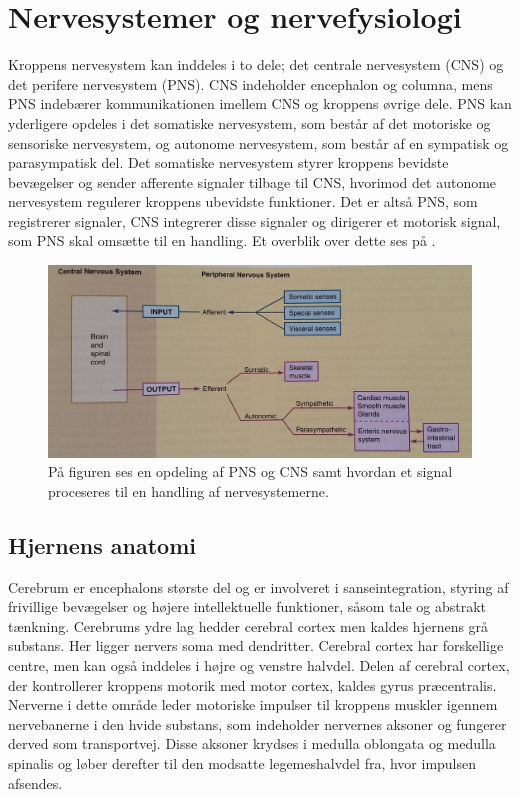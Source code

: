 \chapter{Nervesystemer og nervefysiologi}\label{AppNerve}
Kroppens nervesystem kan inddeles i to dele; det centrale nervesystem (CNS) og det perifere nervesystem (PNS). CNS indeholder encephalon og columna, mens PNS indebærer kommunikationen imellem CNS og kroppens øvrige dele. PNS kan yderligere opdeles i det somatiske nervesystem, som består af det motoriske og sensoriske nervesystem, og autonome nervesystem, som består af en sympatisk og parasympatisk del. Det somatiske nervesystem styrer kroppens bevidste bevægelser og sender afferente signaler tilbage til CNS, hvorimod det autonome nervesystem regulerer kroppens ubevidste funktioner. Det er altså PNS, som registrerer signaler, CNS integrerer disse signaler og dirigerer et motorisk signal, som PNS skal omsætte til en handling. \cite{Martini2012,Stanfield2014} Et overblik over dette ses på .

\begin{figure}[H]
	\centering
	\includegraphics[scale=0.15]{figures/bProblemanalyse/Nervesys1.jpg}
	\caption{På figuren ses en opdeling af PNS og CNS samt hvordan et signal proceseres til en handling af nervesystemerne. \cite{Stanfield2014}}
	\label{Nersys}
\end{figure}

\section{Hjernens anatomi}
Cerebrum er encephalons største del og er involveret i sanseintegration, styring af frivillige bevægelser og højere intellektuelle funktioner, såsom tale og abstrakt tænkning. \cite{Academic2015b} Cerebrums ydre lag hedder cerebral cortex men kaldes hjernens grå substans. Her ligger nervers soma med dendritter. Cerebral cortex har forskellige centre, men kan også inddeles i højre og venstre halvdel. Delen af cerebral cortex, der kontrollerer kroppens motorik med motor cortex, kaldes gyrus præcentralis. Nerverne i dette område leder motoriske impulser til kroppens muskler igennem nervebanerne i den hvide substans, som indeholder nervernes aksoner og fungerer derved som transportvej. \cite{Academic2015b,Martini2012,Stanfield2014} Disse aksoner krydses i medulla oblongata og medulla spinalis og løber derefter til den modsatte legemeshalvdel fra, hvor impulsen afsendes. \cite{Martini2012}


